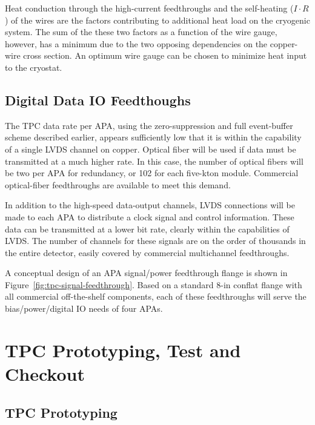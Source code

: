 Heat conduction through the high-current feedthroughs and the self-heating ($I\cdot R$) of the wires are the factors
contributing to additional heat load on the cryogenic system.
The sum of the these two factors as a function of the wire gauge, however, has a minimum 
due to the two opposing dependencies on the copper-wire cross section.
An optimum wire gauge can be chosen to minimize heat input to the cryostat.

\subsection{Digital Data IO Feedthoughs}
\label{subsec:ce-feedthru-digital}

The TPC data rate per APA, using the zero-suppression and full event-buffer scheme described earlier, appears sufficiently low that it is within the capability of a single LVDS channel on copper. Optical fiber will be used if data must be transmitted at a much higher rate.  In this case, the number of optical fibers will be two per APA for redundancy, or 102 for each five-kton module. Commercial optical-fiber feedthroughs are available to meet this demand.

In addition to the high-speed data-output channels,  LVDS connections will be made to each APA to 
distribute a clock signal and control information.  These data 
can be transmitted at a lower bit rate, clearly within the
capabilities of LVDS. The number of channels for these signals 
are on the order of thousands in the entire detector, easily covered by commercial multichannel feedthroughs. 

A conceptual design of an APA signal/power feedthrough flange is shown in Figure~\ref{fig:tpc-signal-feedthrough}.  Based on a standard 8-in conflat flange with all commercial off-the-shelf components, each of these feedthroughs will serve the bias/power/digital IO needs of four APAs.  

\section{TPC Prototyping, Test and  Checkout}
\label{sec:v5-tpc-checkout}

\subsection{TPC Prototyping}
\label{sec:v5-tpc-checkout-prototype}

